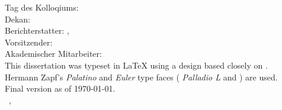 \thispagestyle{empty}

\hfill
\vfill

{\raggedright
\noindent
Tag des Kolloqiums:  \\
Dekan:   \\  
Berichterstatter:  \myProf, \myOtherProf \\
Vorsitzender:  \\
Akademischer Mitarbeiter: \\
\bigskip
\noindent
This dissertation was typeset in \LaTeX{}  using a design based closely on \texttt{\classicthesis}.
Hermann Zapf's \emph{Palatino} and \emph{Euler} type faces (\emph{ Palladio L} and \emph{}) are used.\\
\bigskip
\noindent
{Final version} as of \today.\\
\bigskip
\noindent
\textcopyright\ \myName, \myTime
}
